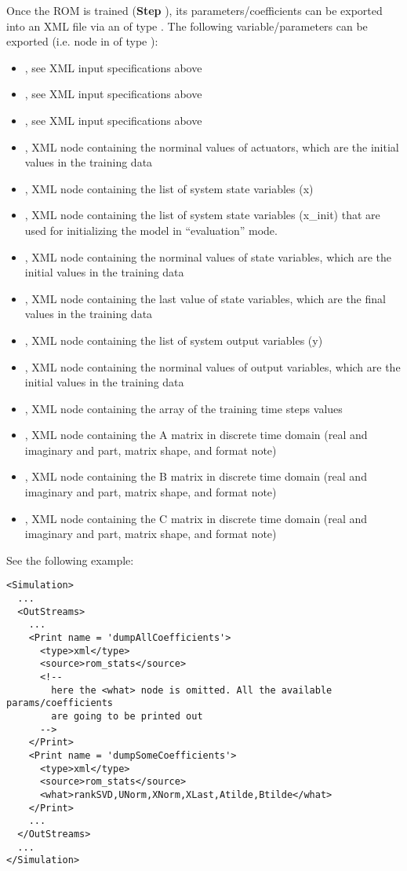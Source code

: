 Once the ROM  is trained (\textbf{Step} ), its parameters/coefficients can be exported into an XML file
via an  of type . The following variable/parameters can be exported (i.e.  node
in  of type ):
\begin{itemize}
  \item {}, see XML input specifications above
  \item {}, see XML input specifications above
  \item {}, see XML input specifications above
  \item {}, XML node containing the norminal values of actuators, which are the initial values in the training data
  \item {}, XML node containing the list of system state variables (x)
  \item {}, XML node containing the list of system state variables 
  (x\_init) that are used for initializing the model in ``evaluation'' mode.
  \item {}, XML node containing the norminal values of state variables, which are the initial values in the training data
  \item {}, XML node containing the last value of state variables, which are the final values in the training data
  \item {}, XML node containing the list of system output variables (y)
  \item {}, XML node containing the norminal values of output variables, which are the initial values in the training data
  \item {}, XML node containing the array of the training time steps values
  \item {}, XML node containing the A matrix in discrete time domain (real and imaginary and part, matrix shape, and format note)
  \item {}, XML node containing the B matrix in discrete time domain (real and imaginary and part, matrix shape, and format note)
  \item {}, XML node containing the C matrix in discrete time domain (real and imaginary and part, matrix shape, and format note)
\end{itemize}


 See the following example:
\begin{lstlisting}[style=XML,morekeywords={name,subType}]
<Simulation>
  ...
  <OutStreams>
    ...
    <Print name = 'dumpAllCoefficients'>
      <type>xml</type>
      <source>rom_stats</source>
      <!--
        here the <what> node is omitted. All the available params/coefficients
        are going to be printed out
      -->
    </Print>
    <Print name = 'dumpSomeCoefficients'>
      <type>xml</type>
      <source>rom_stats</source>
      <what>rankSVD,UNorm,XNorm,XLast,Atilde,Btilde</what>
    </Print>
    ...
  </OutStreams>
  ...
</Simulation>
\end{lstlisting}


